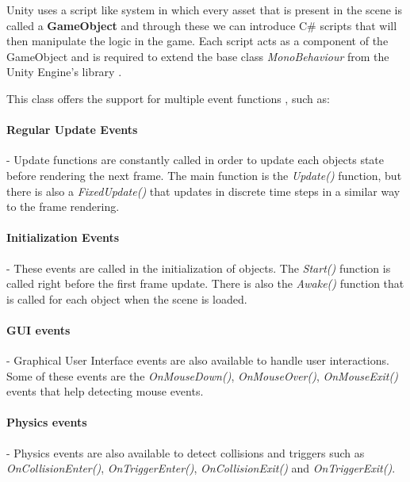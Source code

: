 Unity uses a script like system in which every asset that is present in the scene is called a \textbf{GameObject} and through these we can introduce C\# scripts that will then manipulate the logic in the game. Each script acts as a component of the GameObject and is required to extend the base class \textit{MonoBehaviour} from the Unity Engine's library \cite{unityDocMonoBehaviour}.

This class offers the support for multiple event functions \cite{unityDocEvent}, such as:

\paragraph{Regular Update Events} - Update functions are constantly called in order to update each objects state before rendering the next frame. The main function is the \textit{Update()} function, but there is also a \textit{FixedUpdate()} that updates in discrete time steps in a similar way to the frame rendering.

\paragraph{Initialization Events} - These events are called in the initialization of objects. The \textit{Start()} function is called right before the first frame update. There is also the \textit{Awake()} function that is called for each object when the scene is loaded. 

\paragraph{GUI events} - Graphical User Interface events are also available to handle user interactions. Some of these events are the \textit{OnMouseDown()}, \textit{OnMouseOver()}, \textit{OnMouseExit()} events that help detecting mouse events.

\paragraph{Physics events} - Physics events are also available to detect collisions and triggers such as \textit{OnCollisionEnter()}, \textit{OnTriggerEnter()}, \textit{OnCollisionExit()} and \textit{OnTriggerExit()}.


